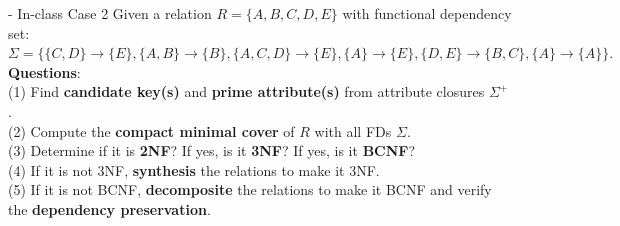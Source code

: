 \begin{frame}[fragile]{ - In-class Case 2}
	Given a relation $R=\{A, B, C, D, E\}$ with functional dependency set:\\ 
	$\Sigma=\{\{C,D\} \rightarrow \{E\},\{A,B\} \rightarrow \{B\}, \{A,C,D\} \rightarrow \{E\},\{A\} \rightarrow \{E\},\{D,E\} \rightarrow \{B,C\},\{A\} \rightarrow \{A\}\}.$\\\vspace{10pt}
	\textbf{Questions}:\\
	(1) Find \textbf{candidate key(s)} and \textbf{prime attribute(s)} from attribute closures $\Sigma^{+}$.\\
	(2) Compute the \textbf{compact minimal cover} of $R$ with all FDs $\Sigma$.\\
	(3) Determine if it is \textbf{2NF}? If yes, is it \textbf{3NF}? If yes, is it \textbf{BCNF}?\\
	(4) If it is not 3NF, \textbf{synthesis} the relations to make it 3NF.\\
	(5) If it is not BCNF, \textbf{decomposite} the relations to make it BCNF and verify the \textbf{dependency preservation}. 
\end{frame}

